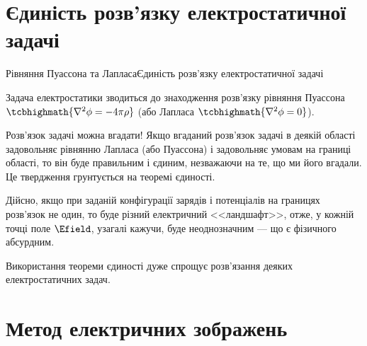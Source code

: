 \documentclass[onlytextwidth]{beamer}
\begin{document}
\section{Єдиність розв'язку електростатичної задачі}



\begin{frame}{Рівняння Пуассона та Лапласа}{Єдиність розв'язку електростатичної задачі}
	\begin{block}{}\justifying
		Задача електростатики зводиться до \alert{знаходження розв'язку}
		рівняння Пуассона $\tcbhighmath{\nabla^2\phi = - 4\pi\rho}$ (або Лапласа
		$\tcbhighmath{\nabla^2\phi = 0}$).
	\end{block}
	\begin{block}{}\justifying
		Розв'язок задачі можна \alert{вгадати}! Якщо \alert{вгаданий розв'язок} задачі в деякій
		\alert{області} задовольняє рівнянню Лапласа (або Пуассона)  і задовольняє \alert{умовам на
			границі області}, то він буде правильним і \alert{єдиним}, незважаючи на те, що ми його
		вгадали. Це твердження грунтується на \alert{теоремі єдиності}.
	\end{block}


	\begin{block}{}\justifying\footnotesize
		Дійсно, якщо при заданій конфігурації зарядів і потенціалів
		на границях розв'язок не один, то буде різний електричний <<ландшафт>>, отже, у кожній
		точці поле $\Efield$, узагалі кажучи, буде неоднозначним --- що є фізичного абсурдним.
	\end{block}

	\begin{block}{}\justifying
		Використання теореми єдиності дуже \alert{спрощує} розв'язання деяких електростатичних
		задач.
	\end{block}

\end{frame}



\section{Метод електричних зображень}
\end{document}
